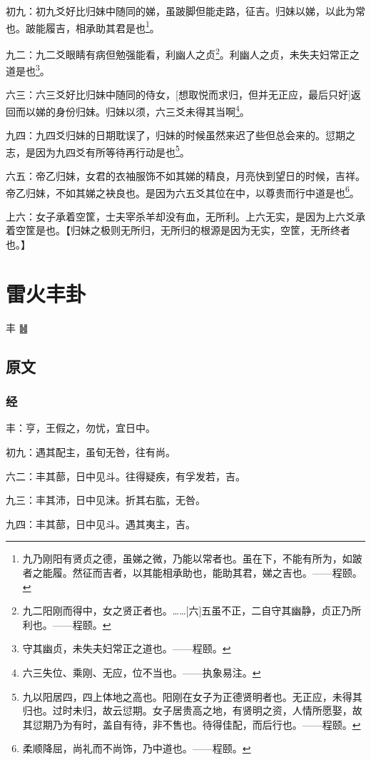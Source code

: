 \documentclass[12pt,oneside]{book}
\begin{document}
初九：初九爻好比归妹中随同的娣，虽跛脚但能走路，征吉。归妹以娣，以此为常也。跛能履吉，相承助其君是也\footnote{九乃刚阳有贤贞之德，虽娣之微，乃能以常者也。虽在下，不能有所为，如跛者之能履。然征而吉者，以其能相承助也，能助其君，娣之吉也。——程颐。}。

九二：九二爻眼睛有病但勉强能看，利幽人之贞\footnote{九二阳刚而得中，女之贤正者也。……[六]五虽不正，二自守其幽静，贞正乃所利也。——程颐。}。利幽人之贞，未失夫妇常正之道是也\footnote{守其幽贞，未失夫妇常正之道也。——程颐。}。

六三：六三爻好比归妹中随同的侍女，[想取悦而求归，但并无正应，最后只好]返回而以娣的身份归妹。归妹以须，六三爻未得其当啊\footnote{六三失位、乘刚、无应，位不当也。——执象易注。}。

九四：九四爻归妹的日期耽误了，归妹的时候虽然来迟了些但总会来的。愆期之志，是因为九四爻有所等待再行动是也\footnote{九以阳居四，四上体地之高也。阳刚在女子为正德贤明者也。无正应，未得其归也。过时未归，故云愆期。女子居贵高之地，有贤明之资，人情所愿娶，故其愆期乃为有时，盖自有待，非不售也。待得佳配，而后行也。——程颐。}。

六五：帝乙归妹，女君的衣袖服饰不如其娣的精良，月亮快到望日的时候，吉祥。帝乙归妹，不如其娣之袂良也。是因为六五爻其位在中，以尊贵而行中道是也\footnote{柔顺降屈，尚礼而不尚饰，乃中道也。——程颐。}。

上六：女子承着空筐，士夫宰杀羊却没有血，无所利。上六无实，是因为上六爻承着空筐是也。【归妹之极则无所归，无所归的根源是因为无实，空筐，无所终者也。】



\chapter{雷火丰卦}
丰 {\Large ䷶}

\section{原文}

\subsection{经}
丰：亨，王假之，勿忧，宜日中。

初九：遇其配主，虽旬无咎，往有尚。

六二：丰其蔀，日中见斗。往得疑疾，有孚发若，吉。

九三：丰其沛，日中见沫。折其右肱，无咎。

九四：丰其蔀，日中见斗。遇其夷主，吉。
\end{document}
